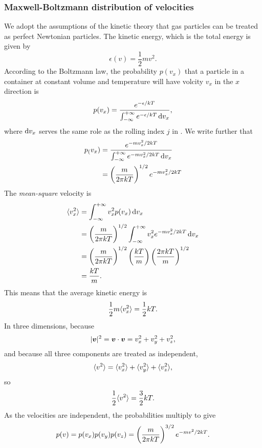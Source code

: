 \subsubsection{Maxwell-Boltzmann distribution of velocities}
We adopt the assumptions of the kinetic theory that gas particles can be 
treated as perfect Newtonian particles. The kinetic energy, which is the total energy is given by 
\begin{equation}
\epsilon(v)=\frac{1}{2}mv^2.
\end{equation}
According to the Boltzmann law, the probability $p(v_x)$ that a particle in a container at constant volume and temperature will have volcity $v_x$ in the $x$ direction is 
\begin{equation}
p(v_x)=\frac{e^{-\epsilon/kT}}{\intinf e^{-\epsilon/kT}\dif v_x}, 
\end{equation}
where $\dif v_x$ serves the same role as the rolling index $j$ in . 
We write further that
\begin{subequations}
\begin{align}
p_(v_x)&=\frac{e^{-mv_x^2/2kT}}{\intinf e^{-mv_x^2/2kT}\dif v_x}\\
&=\lf(\frac{m}{2\pi kT} \rt)^{1/2}e^{-mv_x^2/2kT}
\end{align}
\end{subequations}
The \textit{mean-square} velocity is
\begin{subequations}
\begin{align}
\lgl v_x^2\rgl&=\intinf v_x^2p(v_x)\dif v_x\\
&=\lf(\frac{m}{2\pi kT} \rt)^{1/2}\intinf v_x^2e^{-mv_x^2/2kT}\dif v_x\\
&=\lf(\frac{m}{2\pi kT} \rt)^{1/2}\lf(\frac{kT}{m} \rt)\lf(\frac{2\pi kT}{m} \rt)^{1/2} \\
&=\frac{kT}{m}.
\end{align}
\end{subequations}
This means that the average kinetic energy is 
\begin{equation}
\frac{1}{2}m \langle v_x^2\rangle=\frac{1}{2}kT.
\end{equation}
In three dimensions, because
\begin{equation}
|\boldsymbol{v}|^2=\boldsymbol{v}\cdot\boldsymbol{v}=v_x^2+v_y^2+v_z^2,
\end{equation}
and because all three components are treated as independent,
\begin{equation}
\langle v^2\rangle=\langle v_x^2\rangle+\langle v_y^2\rangle+\langle v_z^2\rangle,
\end{equation}
so
\begin{equation}
\frac{1}{2}\langle v^2\rangle=\frac{3}{2}kT.
\end{equation}
As the velocities are independent, the probabilities multiply to give
\begin{equation}
p(v)=p(v_x)p(v_y)p(v_z)=\left(\frac{m}{2\pi kT} \right)^{3/2}e^{-mv^2/2kT}.
\end{equation}




